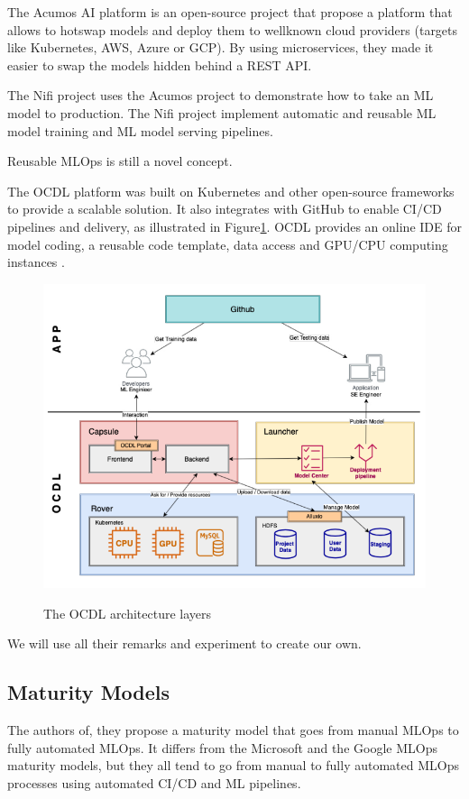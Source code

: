 The Acumos AI platform\cite{10690392} is an open-source project that propose a platform that allows to hotswap models and deploy
them to wellknown cloud providers (targets like Kubernetes, AWS, Azure or GCP).
By using microservices, they made it easier to swap the models hidden behind a REST API\@.

The Nifi project\cite{10346079} uses the Acumos project to demonstrate how to take an ML model
to production.
The Nifi project implement automatic and reusable ML model training and ML model serving pipelines.

Reusable MLOps is still a novel concept\cite{10690392}.

The OCDL platform\cite{LIU2020704} was built on Kubernetes and other open-source frameworks to provide a scalable solution.
It also integrates with GitHub to enable CI/CD pipelines and delivery, as illustrated in Figure\ref{fig:ocdl}.
OCDL provides an online IDE for model coding, a reusable code template, data access and GPU/CPU computing instances\cite{LIU2020704} .

\begin{figure}[!htbp]
    \caption{The OCDL architecture layers\cite{LIU2020704}}
    \centering
    \includegraphics[scale=0.5]{images/ocdl-architecture}
    \label{fig:ocdl}
\end{figure}

We will use all their remarks and experiment to create our own.



\subsection{Maturity Models}\label{subsec:matutiry-models}
The authors of\cite{mlops-maturity-model}, they propose a maturity model that goes from manual MLOps to fully automated MLOps.
It differs from the Microsoft and the Google MLOps maturity models,
but they all tend to go from manual to fully automated MLOps processes using automated CI/CD and
ML pipelines.\cite{mlops-definition-tools-and-challenge}

